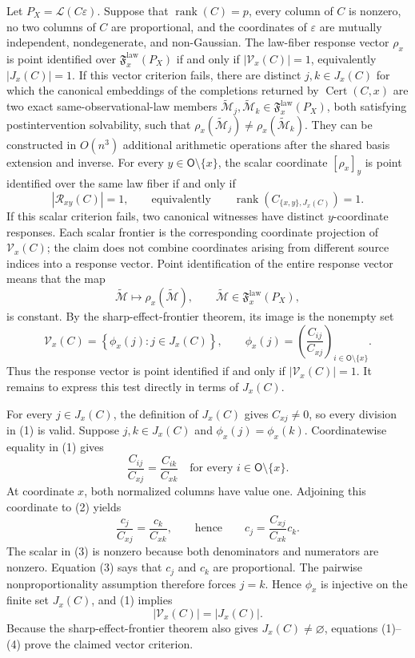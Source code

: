 Let \(P_X=\mathcal L(C\varepsilon)\). Suppose that \(\operatorname{rank}(C)=p\), every column of \(C\) is nonzero, no two columns of \(C\) are proportional, and the coordinates of \(\varepsilon\) are mutually independent, nondegenerate, and non-Gaussian. The law-fiber response vector \(\rho_x\) is point identified over \(\mathfrak F_x^{\mathrm{law}}(P_X)\) if and only if \(|\mathcal V_x(C)|=1\), equivalently \(|J_x(C)|=1\). If this vector criterion fails, there are distinct \(j,k\in J_x(C)\) for which the canonical embeddings of the completions returned by \(\operatorname{Cert}(C,x)\) are two exact same-observational-law members \(\widetilde{\mathcal M}_j,\widetilde{\mathcal M}_k\in\mathfrak F_x^{\mathrm{law}}(P_X)\), both satisfying postintervention solvability, such that \(\rho_x(\widetilde{\mathcal M}_j)\ne\rho_x(\widetilde{\mathcal M}_k)\). They can be constructed in \(O(n^3)\) additional arithmetic operations after the shared basis extension and inverse. For every \(y\in\mathsf O\setminus\{x\}\), the scalar coordinate \([\rho_x]_y\) is point identified over the same law fiber if and only if
\[
 |\mathcal R_{xy}(C)|=1,
 \qquad\text{equivalently}\qquad
 \operatorname{rank}\!\left(C_{\{x,y\},J_x(C)}\right)=1.
\]
If this scalar criterion fails, two canonical witnesses have distinct \(y\)-coordinate responses. Each scalar frontier is the corresponding coordinate projection of \(\mathcal V_x(C)\); the claim does not combine coordinates arising from different source indices into a response vector.
Point identification of the entire response vector means that the map
\[
 \widetilde{\mathcal M}\longmapsto\rho_x(\widetilde{\mathcal M}),
 \qquad
 \widetilde{\mathcal M}\in\mathfrak F_x^{\mathrm{law}}(P_X),
\]
is constant. By the sharp-effect-frontier theorem, its image is the nonempty set
\[
 \mathcal V_x(C)
 =\left\{\phi_x(j):j\in J_x(C)\right\},
 \qquad
 \phi_x(j)=\left(\frac{C_{ij}}{C_{xj}}\right)_{i\in\mathsf O\setminus\{x\}}. \tag{1}
\]
Thus the response vector is point identified if and only if \(|\mathcal V_x(C)|=1\). It remains to express this test directly in terms of \(J_x(C)\).

For every \(j\in J_x(C)\), the definition of \(J_x(C)\) gives \(C_{xj}\ne0\), so every division in (1) is valid. Suppose \(j,k\in J_x(C)\) and \(\phi_x(j)=\phi_x(k)\). Coordinatewise equality in (1) gives
\[
 \frac{C_{ij}}{C_{xj}}=\frac{C_{ik}}{C_{xk}}
 \quad\text{for every }i\in\mathsf O\setminus\{x\}. \tag{2}
\]
At coordinate \(x\), both normalized columns have value one. Adjoining this coordinate to (2) yields
\[
 \frac{c_j}{C_{xj}}=\frac{c_k}{C_{xk}},
 \qquad\text{hence}\qquad
 c_j=\frac{C_{xj}}{C_{xk}}c_k. \tag{3}
\]
The scalar in (3) is nonzero because both denominators and numerators are nonzero. Equation (3) says that \(c_j\) and \(c_k\) are proportional. The pairwise nonproportionality assumption therefore forces \(j=k\). Hence \(\phi_x\) is injective on the finite set \(J_x(C)\), and (1) implies
\[
 |\mathcal V_x(C)|=|J_x(C)|. \tag{4}
\]
Because the sharp-effect-frontier theorem also gives \(J_x(C)\ne\varnothing\), equations (1)--(4) prove the claimed vector criterion.

